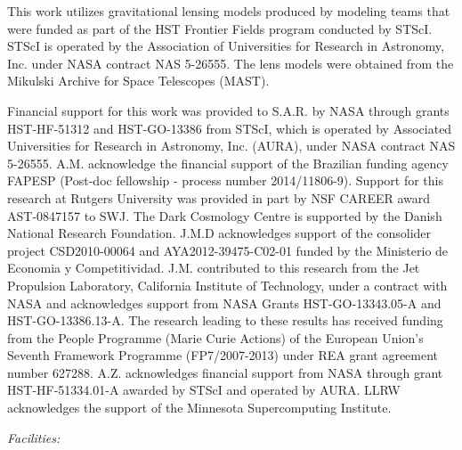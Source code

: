 This work utilizes gravitational lensing models produced by modeling
teams that were funded as part of the HST Frontier Fields program
conducted by STScI. STScI is operated by the Association of
Universities for Research in Astronomy, Inc. under NASA contract NAS
5-26555. The lens models were obtained from the Mikulski Archive for
Space Telescopes (MAST).

Financial support for this work was provided to S.A.R. by NASA through
grants HST-HF-51312 and HST-GO-13386 from STScI, which is operated by
Associated Universities for Research in Astronomy, Inc. (AURA), under
NASA contract NAS 5-26555. A.M. acknowledge the financial support of
the Brazilian funding agency FAPESP (Post-doc fellowship - process
number 2014/11806-9). Support for this research at Rutgers University
was provided in part by NSF CAREER award AST-0847157 to SWJ.  The Dark
Cosmology Centre is supported by the Danish National Research
Foundation. J.M.D acknowledges support of the consolider project
CSD2010-00064 and AYA2012-39475-C02-01 funded by the Ministerio de
Economia y Competitividad. J.M. contributed to this research from the
Jet Propulsion Laboratory, California Institute of Technology, under a
contract with NASA and acknowledges support from NASA Grants
HST-GO-13343.05-A and HST-GO-13386.13-A. The research leading to these
results has received funding from the People Programme (Marie Curie
Actions) of the European Union's Seventh Framework Programme
(FP7/2007-­2013) under REA grant agreement number
627288. A.Z. acknowledges financial support from NASA through grant
HST-HF-51334.01-A awarded by STScI and operated by AURA. LLRW
acknowledges the support of the Minnesota Supercomputing Institute.

{\it Facilities:} 
\smallskip




%


